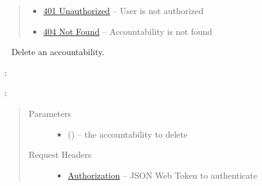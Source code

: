 \documentclass[letterpaper,10pt,english]{sphinxmanual}
\begin{document}
\begin{fulllineitems}
\begin{quote}
\begin{description}
\begin{itemize}
\item {} 
\href{http://www.w3.org/Protocols/rfc2616/rfc2616-sec10.html\#sec10.4.2}{401 Unauthorized} -- User is not authorized

\item {} 
\href{http://www.w3.org/Protocols/rfc2616/rfc2616-sec10.html\#sec10.4.5}{404 Not Found} -- Accountability is not found

\end{itemize}

\end{description}\end{quote}

\end{fulllineitems}



\begin{fulllineitems}
\label{\detokenize{resources/accountability:delete--accountabilities-(accountability_id)}}~
Delete an accountability.

:

\begin{sphinxVerbatim}[commandchars=\\\{\}]
  
 
 
\end{sphinxVerbatim}

:

\begin{sphinxVerbatim}[commandchars=\\\{\}]
  
\end{sphinxVerbatim}
\begin{quote}\begin{description}
\item[{Parameters}] \leavevmode\begin{itemize}
\item {} 
 () -- the accountability to delete

\end{itemize}

\item[{Request Headers}] \leavevmode\begin{itemize}
\item {} 
\href{http://tools.ietf.org/html/rfc7235\#section-4.2}{Authorization} -- JSON Web Token to authenticate


\end{itemize}
\end{description}
\end{quote}
\end{fulllineitems}
\end{document}
